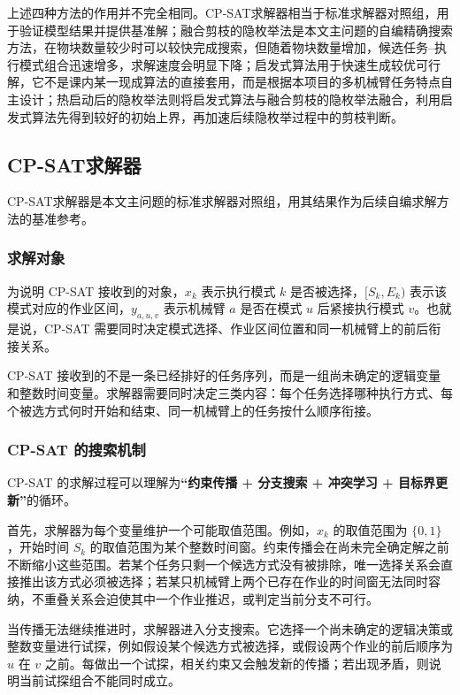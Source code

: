 上述四种方法的作用并不完全相同。CP-SAT求解器相当于标准求解器对照组，用于验证模型结果并提供基准解；融合剪枝的隐枚举法是本文主问题的自编精确搜索方法，在物块数量较少时可以较快完成搜索，但随着物块数量增加，候选任务--执行模式组合迅速增多，求解速度会明显下降；启发式算法用于快速生成较优可行解，它不是课内某一现成算法的直接套用，而是根据本项目的多机械臂任务特点自主设计；热启动后的隐枚举法则将启发式算法与融合剪枝的隐枚举法融合，利用启发式算法先得到较好的初始上界，再加速后续隐枚举过程中的剪枝判断。

\subsection{CP-SAT求解器}

CP-SAT求解器是本文主问题的标准求解器对照组，用其结果作为后续自编求解方法的基准参考。

\subsubsection{求解对象}

为说明 CP-SAT 接收到的对象，$x_k$ 表示执行模式 $k$ 是否被选择，$[S_k,E_k)$ 表示该模式对应的作业区间，$y_{a,u,v}$ 表示机械臂 $a$ 是否在模式 $u$ 后紧接执行模式 $v$。也就是说，CP-SAT 需要同时决定模式选择、作业区间位置和同一机械臂上的前后衔接关系。

CP-SAT 接收到的不是一条已经排好的任务序列，而是一组尚未确定的逻辑变量和整数时间变量。求解器需要同时决定三类内容：每个任务选择哪种执行方式、每个被选方式何时开始和结束、同一机械臂上的任务按什么顺序衔接。

\subsubsection{CP-SAT 的搜索机制}

CP-SAT 的求解过程可以理解为\textbf{“约束传播 + 分支搜索 + 冲突学习 + 目标界更新”}的循环。

首先，求解器为每个变量维护一个可能取值范围。例如，$x_k$ 的取值范围为 $\{0,1\}$，开始时间 $S_k$ 的取值范围为某个整数时间窗。约束传播会在尚未完全确定解之前不断缩小这些范围。若某个任务只剩一个候选方式没有被排除，唯一选择关系会直接推出该方式必须被选择；若某只机械臂上两个已存在作业的时间窗无法同时容纳，不重叠关系会迫使其中一个作业推迟，或判定当前分支不可行。

当传播无法继续推进时，求解器进入分支搜索。它选择一个尚未确定的逻辑决策或整数变量进行试探，例如假设某个候选方式被选择，或假设两个作业的前后顺序为 $u$ 在 $v$ 之前。每做出一个试探，相关约束又会触发新的传播；若出现矛盾，则说明当前试探组合不能同时成立。

